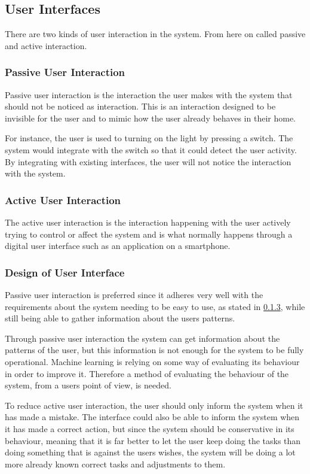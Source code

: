 \subsection{User Interfaces}
There are two kinds of user interaction in the system. From here on called passive and active interaction.

\subsubsection{Passive User Interaction}
Passive user interaction is the interaction the user makes with the system that should not be noticed as interaction. This is an interaction designed to be invisible for the user and to mimic how the user already behaves in their home.

For instance, the user is used to turning on the light by pressing a switch. The system would integrate with the switch so that it could detect the user activity. By integrating with existing interfaces, the user will not notice the interaction with the system.

\subsubsection{Active User Interaction}
The active user interaction is the interaction happening with the user actively trying to control or affect the system and is what normally happens through a digital user interface such as an application on a smartphone.

\subsubsection{Design of User Interface}
Passive user interaction is preferred since it adheres very well with the requirements about the system needing to be easy to use, as stated in \cref{}, while still being able to gather information about the users patterns.

Through passive user interaction the system can get information about the patterns of the user, but this information is not enough for the system to be fully operational. Machine learning is relying on some way of evaluating its behaviour in order to improve it. Therefore a method of evaluating the behaviour of the system, from a users point of view, is needed.
 
To reduce active user interaction, the user should only inform the system when it has made a mistake. The interface could also be able to inform the system when it has made a correct action, but since the system should be conservative in its behaviour, meaning that it is far better to let the user keep doing the tasks than doing something that is against the users wishes, the system will be doing a lot more already known correct tasks and adjustments to them.

